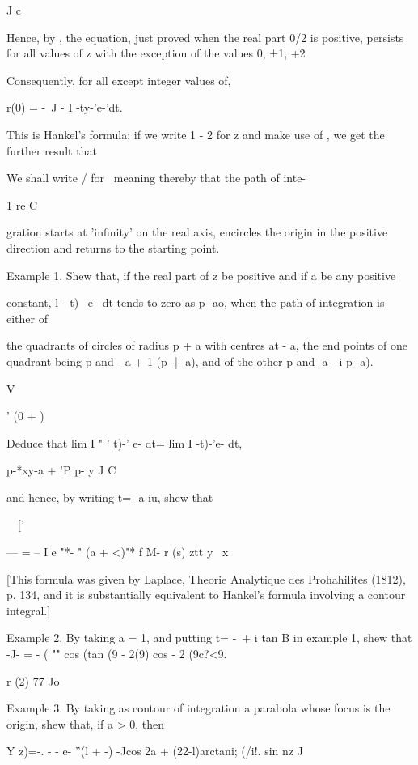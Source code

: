 J c

Hence, by , the equation, just proved when the real part 0/2 is
positive, persists for all values of z with the exception of the
values 0, ±1, +2

Consequently, for all except integer values of,

r(0) = -\ J - I -ty-'e-'dt.

This is Hankel's formula; if we write 1 - 2 for z and make use of
, we get the further result that

We shall write / for \, meaning thereby that the path of inte-

1 re C

gration starts at 'infinity' on the real axis, encircles the origin in
the positive direction and returns to the starting point.

Example 1. Shew that, if the real part of z be positive and if a be
any positive

constant, l - t)~ e~ dt tends to zero as p -ao, when the path of
integration is either of

the quadrants of circles of radius p + a with centres at - a, the end
points of one quadrant being p and - a + 1 (p -|- a), and of the other
p and -a - i p- a).

V

' (0 + )

%
%

Deduce that lim I " ' t)-' e- dt= lim I -t)-'e- dt,

p-*xy-a + 'P p- y J C

and hence, by writing t= -a-iu, shew that

\ \ ['

--- = -- I e "*- " (a + <)"* f M- r (s) ztt y \ x

[This formula was given by Laplace, Theorie Analytique des
Prohahilites (1812), p. 134, and it is substantially equivalent to
Hankel's formula involving a contour integral.]

Example 2, By taking a = 1, and putting t= -\ + i tan B in example 1,
shew that -J- = - ( "" cos (tan (9 - 2(9) cos - 2 (9c?<9.

r (2) 77 Jo

Example 3. By taking as contour of integration a parabola whose focus
is the origin, shew that, if a > 0, then

Y z)=-. - - e- ''(l + -) -Jcos 2a + (22-l)arctani; (/i!. sin nz J


